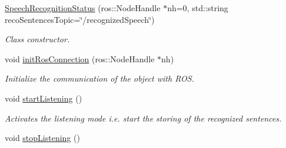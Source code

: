 \begin{DoxyCompactItemize}
\item 
\hyperlink{class_speech_recognition_status_a8a076498b738c172b314eec5797502b8}{Speech\+Recognition\+Status} (ros\+::\+Node\+Handle $\ast$nh=0, std\+::string reco\+Sentences\+Topic=\char`\"{}/recognized\+Speech\char`\"{})
\begin{DoxyCompactList}\small\item\em Class constructor. \end{DoxyCompactList}\item 
void \hyperlink{class_speech_recognition_status_af1cf52b9e55682347779ff61101827d9}{init\+Ros\+Connection} (ros\+::\+Node\+Handle $\ast$nh)
\begin{DoxyCompactList}\small\item\em Initialize the communication of the object with R\+OS. \end{DoxyCompactList}\item 
void \hyperlink{class_speech_recognition_status_a87b7f32cce3498ccaf34792d4557f23f}{start\+Listening} ()\hypertarget{class_speech_recognition_status_a87b7f32cce3498ccaf34792d4557f23f}{}\label{class_speech_recognition_status_a87b7f32cce3498ccaf34792d4557f23f}

\begin{DoxyCompactList}\small\item\em Activates the listening mode i.\+e. start the storing of the recognized sentences. \end{DoxyCompactList}\item 
void \hyperlink{class_speech_recognition_status_acdd801807e5fac5a6e68b1aed8c7ca22}{stop\+Listening} ()\hypertarget{class_speech_recognition_status_acdd801807e5fac5a6e68b1aed8c7ca22}{}\label{class_speech_recognition_status_acdd801807e5fac5a6e68b1aed8c7ca22}


\end{DoxyCompactItemize}
